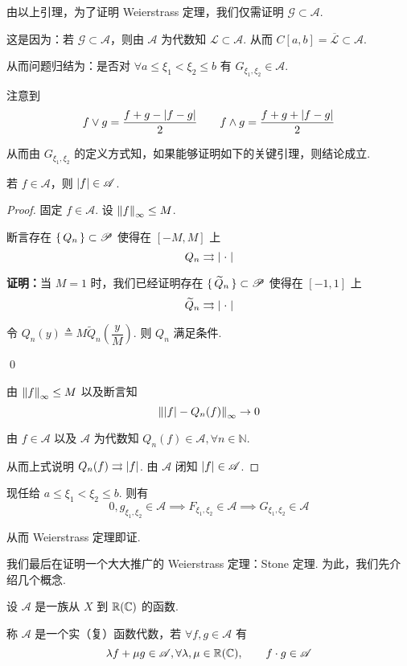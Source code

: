 由以上引理，为了证明 Weierstrass 定理，我们仅需证明 $\mathscr{G}\subset\mathscr{A}$.

这是因为：若 $\mathscr{G}\subset\mathscr{A}$，则由 $\mathscr{A}$ 为代数知 $\mathscr{L}\subset\mathscr{A}$. 从而 $C[a,b]=\overline{\mathscr{L}}\subset\mathscr{A}$.

从而问题归结为：是否对 $\forall a\le\xi_1<\xi_2\le b$ 有 $G_{\xi_1,\xi_2}\in\mathscr{A}$.

注意到
$$
f\vee g=\frac{f+g-\left\lvert{f-g}\right\rvert}{2}\qquad f\wedge g=\frac{f+g+\left\lvert{f-g}\right\rvert}{2}
$$

从而由 $G_{\xi_1,\xi_2}$ 的定义方式知，如果能够证明如下的关键引理，则结论成立.

\begin{lemma}
    若 $f\in\mathscr{A}$，则 $\left\lvert{f}\right\rvert\in\mathscr{A}$.
\end{lemma}
\begin{proof}
    固定 $f\in\mathscr{A}$. 设 $\left\lVert{f}\right\rVert_\infty\le M$.

    断言存在 $\set{Q_n}\subset\mathscr{P}$ 使得在 $[-M,M]$ 上
$$
Q_n\rightrightarrows\left\lvert{\;\cdot\;}\right\rvert
$$

    \textbf{证明：}当 $M=1$ 时，我们已经证明存在 $\set{\widetilde{Q}_n}\subset\mathscr{P}$ 使得在 $[-1,1]$ 上
$$
\widetilde{Q}_n\rightrightarrows\left\lvert{\;\cdot\;}\right\rvert
$$

    令 $Q_n(y)\triangleq M\widetilde{Q}_n\left(\dfrac{y}{M}\right)$. 则 $Q_n$ 满足条件.

    \qed

    由 $\left\lVert{f}\right\rVert_\infty\le M$ 以及断言知
$$
\left\lVert{\left\lvert{f}\right\rvert-Q_n(f)}\right\rVert_\infty\to 0
$$

    由 $f\in\mathscr{A}$ 以及 $\mathscr{A}$ 为代数知 $Q_n(f)\in\mathscr{A},\forall n\in\mathbb{N}$.

    从而上式说明 $Q_n(f)\rightrightarrows\left\lvert{f}\right\rvert$. 由 $\mathscr{A}$ 闭知 $\left\lvert{f}\right\rvert\in\mathscr{A}$.
\end{proof}

现任给 $a\le\xi_1<\xi_2\le b$. 则有
$$
0,g_{\xi_1,\xi_2}\in\mathscr{A}\implies F_{\xi_1,\xi_2}\in\mathscr{A}\implies G_{\xi_1,\xi_2}\in\mathscr{A}
$$

从而 Weierstrass 定理即证.


我们最后在证明一个大大推广的 Weierstrass 定理：Stone 定理. 为此，我们先介绍几个概念.

\begin{definition}
    设 $\mathscr{A}$ 是一族从 $X$ 到 $\mathbb{R}(\mathbb{C})$ 的函数.

    称 $\mathscr{A}$ 是一个实（复）函数代数，若 $\forall f,g\in\mathscr{A}$ 有
$$
\lambda f+\mu g\in\mathscr{A},\forall\lambda,\mu\in\mathbb{R}(\mathbb{C}),\qquad f\cdot g\in\mathscr{A}
$$
\end{definition}

